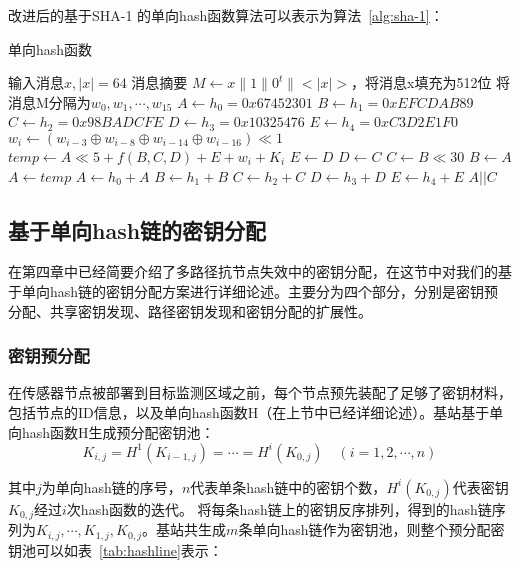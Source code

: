 改进后的基于SHA-1 的单向hash函数算法可以表示为算法~\ref{alg:sha-1}：
\begin{algorithm}[htbp]
  \caption{单向hash函数}
  \label{alg:sha-1}
  \begin{algorithmic}[1]
    \REQUIRE 输入消息$x,|x|=64$
    \ENSURE 消息摘要
    \STATE $M \leftarrow x\| 1\| 0^t\| <|x|>$，将消息x填充为512位
    \STATE 将消息M分隔为$w_0,w_1,\cdots,w_{15}$
    \STATE $A \leftarrow h_0 = 0x67452301$
    \STATE $B \leftarrow h_1 = 0xEFCDAB89$
    \STATE $C \leftarrow h_2 = 0x98BADCFE$
    \STATE $D \leftarrow h_3 = 0x10325476$
    \STATE $E \leftarrow h_4 = 0xC3D2E1F0$
        \STATE $w_i \leftarrow (w_{i-3}\oplus w_{i-8}\oplus w_{i-14}\oplus w_{i-16})\ll 1$
    \ENDFOR
        \STATE $temp \leftarrow A\ll 5 + f(B,C,D)+E+w_i+K_i$
        \STATE $E \leftarrow D$
        \STATE $D \leftarrow C$
        \STATE $C \leftarrow B\ll 30$
        \STATE $B \leftarrow A$
        \STATE $A \leftarrow temp$
    \ENDFOR
    \STATE $A \leftarrow h_0+A$
    \STATE $B \leftarrow h_1+B$
    \STATE $C \leftarrow h_2+C$
    \STATE $D \leftarrow h_3+D$
    \STATE $E \leftarrow h_4+E$
    \RETURN $A||C$
  \end{algorithmic}
\end{algorithm}

\subsection{基于单向hash链的密钥分配}
在第四章中已经简要介绍了多路径抗节点失效中的密钥分配，在这节中对我们的基于单向hash链的密钥分配方案进行详细论述。主要分为四个部分，分别是密钥预分配、共享密钥发现、路径密钥发现和密钥分配的扩展性。
\subsubsection{密钥预分配}
在传感器节点被部署到目标监测区域之前，每个节点预先装配了足够了密钥材料，包括节点的ID信息，以及单向hash函数H（在上节中已经详细论述）。基站基于单向hash函数H生成预分配密钥池：
\begin{equation}
  K_{i,j}=H^{1}(K_{i-1,j})=\cdots=H^{i}(K_{0,j})\quad (i=1,2,\cdots,n)
\end{equation}

其中$j$为单向hash链的序号，$n$代表单条hash链中的密钥个数，$H^{i}(K_{0,j})$代表密钥$K_{0,j}$经过$i$次hash函数的迭代。
将每条hash链上的密钥反序排列，得到的hash链序列为$K_{i,j},\cdots,K_{1,j},K_{0,j}$。基站共生成$m$条单向hash链作为密钥池，则整个预分配密钥池可以如表~\ref{tab:hashline}表示：

